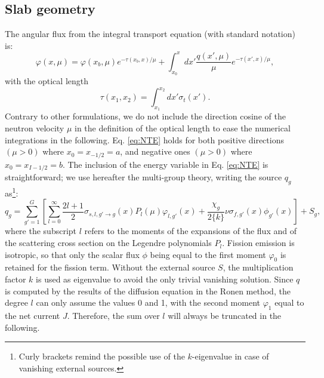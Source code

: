 \documentclass{ictt26}
\begin{document}
\subsection{Slab geometry}
\label{sec:slab}
The angular flux from the integral transport equation (with standard notation) is:
\begin{equation}
\varphi(x, \mu) = \varphi(x_b, \mu) e^{-\tau(x_b, x)/\mu} + \int_{x_0}^x {dx' \frac{q(x', \mu)}{\mu} e^{-\tau(x', x)/\mu}},
\label{eq:NTE}
\end{equation}
with the optical length
\[ \tau(x_1, x_2) = \int_{x_1}^{x_2}{dx' \sigma_t(x')}. \]
Contrary to other formulations, we do not include the direction cosine of the neutron velocity $\mu$ in the definition of the optical length to ease the numerical integrations in the following. Eq. \ref{eq:NTE} holds for both positive directions $(\mu > 0)$ where $x_0 = x_{-1/2} = a$, and negative ones $(\mu > 0)$ where $x_0 = x_{I-1/2} = b$. The inclusion of the energy variable in Eq. \ref{eq:NTE} is straightforward; we use hereafter the multi-group theory, writing the source $q_g$ as\footnote{Curly brackets remind the possible use of the $k$-eigenvalue in case of vanishing external sources.}:
\begin{equation}
\label{eq:srcg}
q_g = \sum_{g'=1}^G{\left[
  \sum_{l=0}^\infty{ \frac{2l+1}{2}\sigma_{s,l, g' \rightarrow g}(x)P_l(\mu)\varphi_{l,g'}(x)
  + \frac{\chi_g}{2\{k\}} \nu\sigma_{f,g'}(x)\phi_{g'}(x)}\right] + S_g
                 },
\end{equation}
where the subscript $l$ refers to the moments of the expansions of the flux and of the scattering cross section on the Legendre polynomials $P_l$. Fission emission is isotropic, so that only the scalar flux $\phi$ being equal to the first moment $\varphi_0$ is retained for the fission term. Without the external source $S$, the multiplication factor $k$ is used as eigenvalue to avoid the only trivial vanishing solution. Since $q$ is computed by the results of the diffusion equation in the Ronen method, the degree $l$ can only assume the values 0 and 1, with the second moment $\varphi_1$ equal to the net current $J$. Therefore, the sum over $l$ will always be truncated in the following. %
\end{document}
